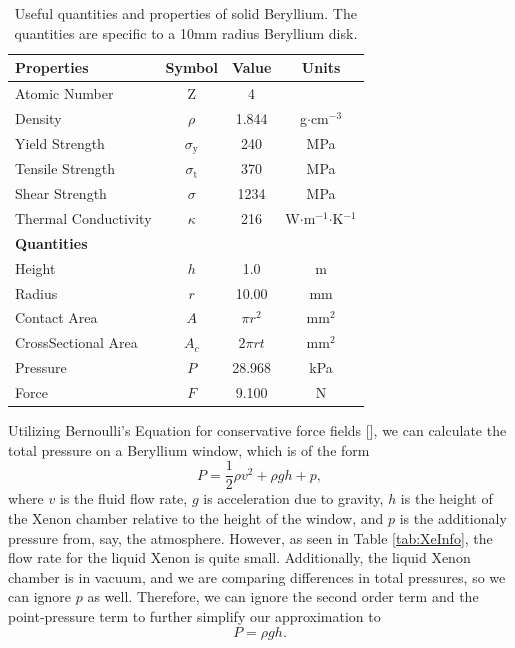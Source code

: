 \documentclass[%
reprint,
amsmath, amssymb,
aps,
floatfix,
]{revtex4-2}
\begin{document}
\begin{table}[h]
    \centering
    \begin{tabular}{lccc}
        \hline \hline
        \textbf{Properties} & \textbf{Symbol} & \textbf{Value} & \textbf{Units} \\
        \hline
        Atomic Number & Z & 4 & \\
        Density & $\rho$ & 1.844 & g$\cdot$cm$^{-3}$ \\
        Yield Strength & $\sigma_\textrm{y}$ & 240 & MPa \\
        Tensile Strength & $\sigma_\textrm{t}$ & 370 & MPa \\
        Shear Strength & $\sigma$ & 1234 & MPa \\
        Thermal Conductivity & $\kappa$ & 216 & W$\cdot$m$^{-1}$$\cdot$K$^{-1}$ \\
        \hline \hline
        \textbf{Quantities} \\
        \hline
        Height & $h$ & 1.0 & m \\
        Radius & $r$ & 10.00 & mm \\
        Contact Area & $A$ & $\pi r^2$ & mm$^2$ \\
        CrossSectional Area & $A_c$ & $2\pi r t$ & mm$^2$ \\
        Pressure & $P$ & 28.968 & kPa \\
        Force & $F$ & 9.100 & N \\
        \hline \hline
    \end{tabular}
    \caption{\label{tab:BeInfo}Useful quantities and properties of solid Beryllium.
    The quantities are specific to a 10mm radius Beryllium disk.}
\end{table}

Utilizing Bernoulli's Equation for conservative force fields [], we can calculate the total
pressure on a Beryllium window, which
is of the form
\begin{equation}
    P = \frac{1}{2} \rho v^2 + \rho g h + p,
\label{eq:Bern}
\end{equation}
where $v$ is the fluid flow rate, $g$ is acceleration due to gravity, $h$ is the height of the Xenon chamber
relative to the height of the window,
and $p$ is the additionaly pressure from, say, the atmosphere.
However, as seen in Table \ref{tab:XeInfo}, the flow rate for the liquid Xenon is quite small.  Additionally,
the liquid Xenon chamber is in vacuum, and we are comparing differences in total pressures,
so we can ignore $p$ as well.  Therefore,
we can ignore the second order term and the point-pressure term to further simplify our approximation to
\begin{equation}
    P = \rho g h.
    \label{eq:BernSimp}
\end{equation}
\end{document}

